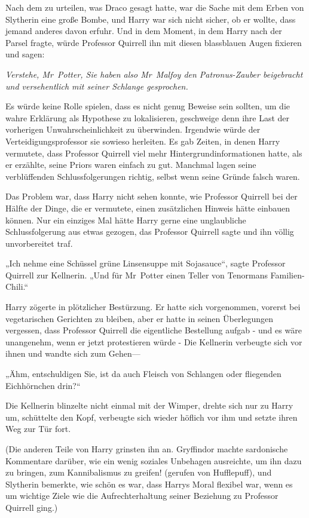{Nach dem zu urteilen, was Draco gesagt hatte, war die Sache mit dem Erben von Slytherin eine große Bombe, und Harry war sich nicht sicher, ob er wollte, dass jemand anderes davon erfuhr. Und in dem Moment, in dem Harry nach der Parsel fragte, würde Professor Quirrell ihn mit diesen blassblauen Augen fixieren und sagen:

\emph{Verstehe, Mr~Potter, Sie haben also Mr~Malfoy den Patronus-Zauber beigebracht und versehentlich mit seiner Schlange gesprochen.}

Es würde keine Rolle spielen, dass es nicht genug Beweise sein sollten, um die wahre Erklärung als Hypothese zu lokalisieren, geschweige denn ihre Last der vorherigen Unwahrscheinlichkeit zu überwinden. Irgendwie würde der Verteidigungsprofessor sie sowieso herleiten. Es gab Zeiten, in denen Harry vermutete, dass Professor Quirrell viel mehr Hintergrundinformationen hatte, als er erzählte, seine Priors waren einfach zu gut. Manchmal lagen seine verblüffenden Schlussfolgerungen richtig, selbst wenn seine Gründe falsch waren.

Das Problem war, dass Harry nicht sehen konnte, wie Professor Quirrell bei der Hälfte der Dinge, die er vermutete, einen zusätzlichen Hinweis hätte einbauen können. Nur ein einziges Mal hätte Harry gerne eine unglaubliche Schlussfolgerung aus etwas gezogen, das Professor Quirrell sagte und ihn völlig unvorbereitet traf.

„Ich nehme eine Schüssel grüne Linsensuppe mit Sojasauce“, sagte Professor Quirrell zur Kellnerin. „Und für Mr~Potter einen Teller von Tenormans Familien-Chili.“

Harry zögerte in plötzlicher Bestürzung. Er hatte sich vorgenommen, vorerst bei vegetarischen Gerichten zu bleiben, aber er hatte in seinen Überlegungen vergessen, dass Professor Quirrell die eigentliche Bestellung aufgab - und es wäre unangenehm, wenn er jetzt protestieren würde - Die Kellnerin verbeugte sich vor ihnen und wandte sich zum Gehen—

„Ähm, entschuldigen Sie, ist da auch Fleisch von Schlangen oder fliegenden Eichhörnchen drin?“

Die Kellnerin blinzelte nicht einmal mit der Wimper, drehte sich nur zu Harry um, schüttelte den Kopf, verbeugte sich wieder höflich vor ihm und setzte ihren Weg zur Tür fort.

(Die anderen Teile von Harry grinsten ihn an. Gryffindor machte sardonische Kommentare darüber, wie ein wenig soziales Unbehagen ausreichte, um ihn dazu zu bringen, zum Kannibalismus zu greifen! (gerufen von Hufflepuff), und Slytherin bemerkte, wie schön es war, dass Harrys Moral flexibel war, wenn es um wichtige Ziele wie die Aufrechterhaltung seiner Beziehung zu Professor Quirrell ging.)

}
